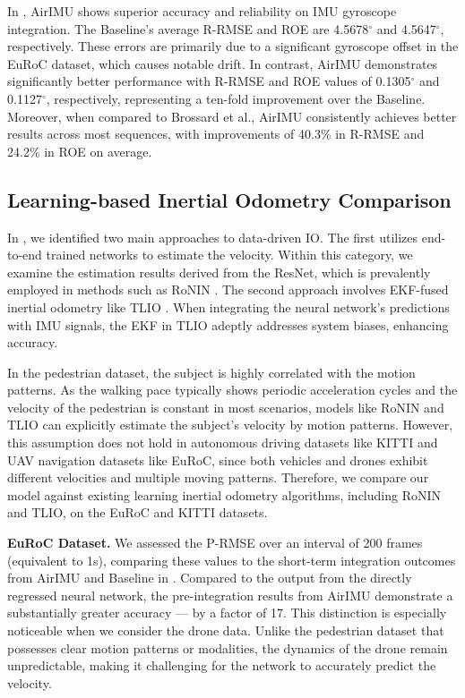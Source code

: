 In , AirIMU shows superior accuracy and reliability on IMU gyroscope integration. 
The Baseline's average R-RMSE and ROE are 4.5678$^{\circ}$ and 4.5647$^{\circ}$, respectively.
These errors are primarily due to a significant gyroscope offset in the EuRoC dataset, which causes notable drift. In contrast, AirIMU demonstrates significantly better performance with R-RMSE and ROE values of 0.1305$^{\circ}$ and 0.1127$^{\circ}$, respectively, representing a ten-fold improvement over the Baseline. Moreover, when compared to Brossard et al., AirIMU consistently achieves better results across most sequences, with improvements of 40.3\% in R-RMSE and 24.2\% in ROE on average.


\subsection{Learning-based Inertial Odometry Comparison}\label{Exp: Learning IO}

In , we identified two main approaches to data-driven IO. 
The first utilizes end-to-end trained networks to estimate the velocity.
Within this category, we examine the estimation results derived from the ResNet, which is prevalently employed in methods such as RoNIN \cite{herath2020ronin}.
The second approach involves EKF-fused inertial odometry like TLIO \cite{liu2020tlio}.
When integrating the neural network's predictions with IMU signals, the EKF in TLIO adeptly addresses system biases, enhancing accuracy.

In the pedestrian dataset, the subject is highly correlated with the motion patterns.
As the walking pace typically shows periodic acceleration cycles and the velocity of the pedestrian is constant in most scenarios, models like RoNIN and TLIO can explicitly estimate the subject's velocity by motion patterns.
However, this assumption does not hold in autonomous driving datasets like KITTI and UAV navigation datasets like EuRoC, since both vehicles and drones exhibit different velocities and multiple moving patterns.
Therefore, we compare our model against existing learning inertial odometry algorithms, including RoNIN and TLIO, on the EuRoC and KITTI datasets. 


\textbf{EuRoC Dataset.}
We assessed the P-RMSE over an interval of 200 frames (equivalent to 1s), comparing these values to the short-term integration outcomes from AirIMU and Baseline in .
Compared to the output from the directly regressed neural network, the pre-integration results from AirIMU demonstrate a substantially greater accuracy --- by a factor of 17. 
This distinction is especially noticeable when we consider the drone data. 
Unlike the pedestrian dataset that possesses clear motion patterns or modalities, the dynamics of the drone remain unpredictable, making it challenging for the network to accurately predict the velocity.

